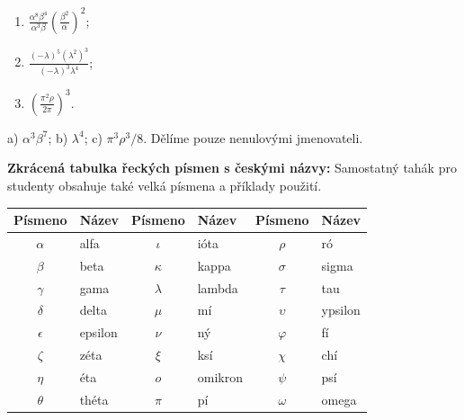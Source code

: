 \documentclass[11pt,a4paper]{article}
\begin{document}
\begin{prikladReseniBox}[title={Příklad 4 — alfa, beta, lambda, ró}]
\begin{enumerate}[label=\alph*)]
\item $\frac{\alpha^8\beta^4}{\alpha^3\beta}\left(\frac{\beta^2}{\alpha}\right)^2$;
\item $\frac{(-\lambda)^5(\lambda^2)^3}{(-\lambda)^3\lambda^4}$;
\item $\left(\frac{\pi^2\rho}{2\pi}\right)^3$.
\end{enumerate}
\tcblower
 a) $\boxed{\alpha^3\beta^7}$;
 b) $\boxed{\lambda^4}$;
 c) $\boxed{\pi^3\rho^3/8}$.
Dělíme pouze nenulovými jmenovateli.
\end{prikladReseniBox}
\textbf{Zkrácená tabulka řeckých písmen s českými názvy:}
Samostatný tahák pro studenty obsahuje také velká písmena a příklady použití.
\begin{center}\footnotesize
\begin{tabularx}{\linewidth}{@{}c l c l c X@{}}
\toprule Písmeno & Název & Písmeno & Název & Písmeno & Název \\\midrule
$\alpha$ & alfa & $\iota$ & ióta & $\rho$ & ró \\
$\beta$ & beta & $\kappa$ & kappa & $\sigma$ & sigma \\
$\gamma$ & gama & $\lambda$ & lambda & $\tau$ & tau \\
$\delta$ & delta & $\mu$ & mí & $\upsilon$ & ypsilon \\
$\epsilon$ & epsilon & $\nu$ & ný & $\varphi$ & fí \\
$\zeta$ & zéta & $\xi$ & ksí & $\chi$ & chí \\
$\eta$ & éta & $o$ & omikron & $\psi$ & psí \\
$\theta$ & théta & $\pi$ & pí & $\omega$ & omega \\\bottomrule
\end{tabularx}\end{center}
\end{document}
